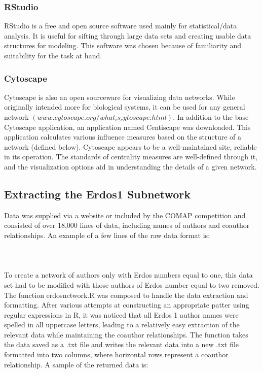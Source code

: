 \documentclass[12pt]{article} %
\begin{document}
      \subsubsection{RStudio}
      \indent RStudio is a free and open source software used mainly for statistical/data analysis. It is useful for sifting through large data sets and creating usable data structures for modeling. This software was chosen because of familiarity and suitability for the task at hand. 
      \subsubsection{Cytoscape} 
      \indent Cytoscape is also an open sourceware for visualizing data networks. While originally intended more for biological systems, it can be used for any general network $(www.cytoscape.org/what_is_cytoscape.html)$. In addition to the base Cytoscape application, an application named Centiscape was downloaded. This application calculates various influence measures based on the structure of a network (defined below). Cytoscape appears to be a well-maintained site, reliable in its operation. The standards of centrality measures are well-defined through it, and the visualization options aid in understanding the details of a given network.

  \subsection{Extracting the Erdos1 Subnetwork}
  \indent Data was supplied via a website or included by the COMAP competition and consisted of over 18,000 lines of data, including names of authors and coauthor relationships. An example of a few lines of the raw data format is:\\
  \\
  \hspace{0.5 in}{ABBOTT, HARVEY LESLIE                   1974\\
  \indent Aull, Charles E.\\
  \indent Brown, Ezra A.\\
  \indent Dierker, Paul F.\\
  \indent Exoo, Geoffrey}\\
  \\
  \indent To create a network of authors only with Erdos numbers equal to one, this data set had to be modified with those authors of Erdos number equal to two removed. The function erdosnetwork.R was composed to handle the data extraction and formatting. After various attempts at constructing an appropriate patter using regular expressions in R, it was noticed that all Erdos 1 author names were spelled in all uppercase letters, leading to a relatively easy extraction of the relevant data while maintaining the coauthor relationships. The function takes the data saved as a .txt file and writes the relevant data into a new .txt file formatted into two columns, where horizontal rows represent a coauthor relationship. A sample of the returned data is:\\
  
\end{document}
